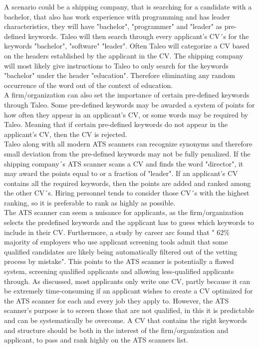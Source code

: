 A scenario could be a shipping company, that is searching for a candidate with a bachelor, that also has work experience with programming and has leader characteristics, they will have "bachelor", "programmer" and "leader" as pre-defined keywords.
Taleo will then search through every applicant's CV´s for the keywords "bachelor", "software" "leader".\cite{ATS_Purpose_Workings}
Often Taleo will categorize a CV based on the headers established by the applicant in the CV.
The shipping company will most likely give instructions to Taleo to only search for the keywords "bachelor" under the header "education".
Therefore eliminating any random occurrence of the word out of the context of education. \\

A firm/organization can also set the importance of certain pre-defined keywords through Taleo.
Some pre-defined keywords may be awarded a system of points for how often they appear in an applicant's CV, or some words may be required by Taleo.
Meaning that if certain pre-defined keywords do not appear in the applicant's CV, then the CV is rejected. \\

Taleo along with all modern ATS scanners can recognize synonyms and therefore small deviation from the pre-defined keywords may not be fully penalized.
If the shipping company´s ATS scanner scans a CV and finds the word "director", it may award the points equal to or a fraction of "leader".
If an applicant's CV contains all the required keywords, then the points are added and ranked among the other CV´s.
Hiring personnel tends to consider those CV´s with the highest ranking, so it is preferable to rank as highly as possible. \\

The ATS scanner can seem a nuisance for applicants, as the firm/organization selects the predefined keywords and the applicant has to guess which keywords to include in their CV.
Furthermore, a study by career arc found that " 62\% majority of employers who use applicant screening tools admit that some qualified candidates are likely being automatically filtered out of the vetting process by mistake".\cite{CV_ATS_Broken_System}
This points to the ATS scanner is potentially a flawed system, screening qualified applicants and allowing less-qualified applicants through.
As discussed, most applicants only write one CV, partly because it can be extremely time-consuming if an applicant wishes to create a CV optimized for the ATS scanner for each and every job they apply to.
However, the ATS scanner's purpose is to screen those that are not qualified, in this it is predictable and can be systematically be overcome.
A CV that contains the right keywords and structure should be both in the interest of the firm/organization and applicant, to pass and rank highly on the ATS scanners list. \\

